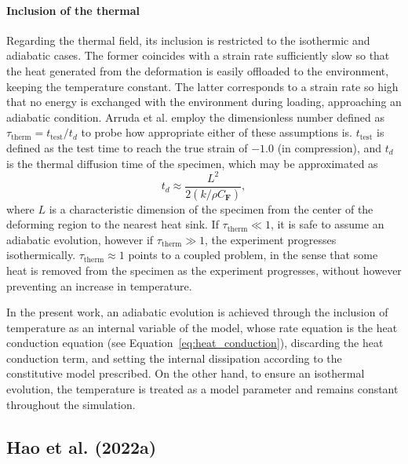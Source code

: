 \paragraph{Inclusion of the thermal}
Regarding the thermal field, its inclusion is restricted to the isothermic and adiabatic cases.
The former coincides with a strain rate sufficiently slow so that the heat generated from the deformation is easily offloaded to the environment, keeping the temperature constant.
The latter corresponds to a strain rate so high that no energy is exchanged with the environment during loading, approaching an adiabatic condition.
Arruda et al. \citep{arrudaEffectsStrainRate1995} employ the dimensionless number defined as $\tau_\text{therm} = t_\text{test}/t_d$ to probe how appropriate either of these assumptions is.
$t_\text{test}$ is defined as the test time to reach the true strain of $-1.0$ (in compression), and $t_d$ is the thermal diffusion time of the specimen, which may be approximated as
\begin{equation}
  t_d \approx \frac{L^2}{2(k/\rho C_\mathbf{F})},
\end{equation}
where $L$ is a characteristic dimension of the specimen from the center of the deforming region to the nearest heat sink.
If $\tau_\text{therm} \ll 1$, it is safe to assume an adiabatic evolution, however if $\tau_\text{therm}\gg 1$, the experiment progresses isothermically.
$\tau_\text{therm}\approx 1$ points to  a coupled problem, in the sense that some heat is removed from the specimen as the experiment progresses, without however preventing an increase in temperature.

In the present work, an adiabatic evolution is achieved through the inclusion of temperature as an internal variable of the model, whose rate equation is the heat conduction equation (see Equation~\eqref{eq:heat_conduction}), discarding the heat conduction term, and setting the internal dissipation according to the constitutive model prescribed.
On the other hand, to ensure an isothermal evolution, the temperature is treated as a model parameter and remains constant throughout the simulation.

\subsection{Hao et al. (2022a)}


